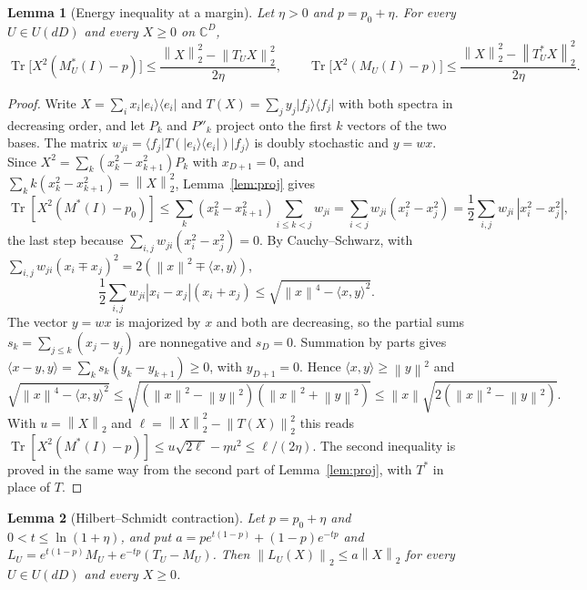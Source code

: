 \documentclass[11pt]{article}
\newtheorem{lemma}{Lemma}[section]
\theoremstyle{definition}
\theoremstyle{remark}
\DeclareMathOperator{\Tr}{Tr}
\newcommand{\C}{\mathbb C}
\newcommand{\norm}[1]{\left\lVert#1\right\rVert}
\newcommand{\ket}[1]{\lvert#1\rangle}
\newcommand{\bra}[1]{\langle#1\rvert}
\begin{document}
\begin{lemma}[Energy inequality at a margin]\label{lem:margin-energy}
Let $\eta>0$ and $p=p_0+\eta$. For every $U\in U(dD)$ and every $X\ge0$ on $\C^D$,
\[
 \Tr\bigl[X^2(M_U^*(I)-p)\bigr]\le\frac{\norm X_2^2-\norm{T_UX}_2^2}{2\eta},\qquad
 \Tr\bigl[X^2(M_U(I)-p)\bigr]\le\frac{\norm X_2^2-\norm{T_U^*X}_2^2}{2\eta}.
\]
\end{lemma}

\begin{proof}
Write $X=\sum_ix_i\ket{e_i}\bra{e_i}$ and $T(X)=\sum_jy_j\ket{f_j}\bra{f_j}$ with both spectra in decreasing order, and let $P_k$ and $P''_k$ project onto the first $k$ vectors of the two bases. The matrix $w_{ji}=\bra{f_j}T(\ket{e_i}\bra{e_i})\ket{f_j}$ is doubly stochastic and $y=wx$. Since $X^2=\sum_k(x_k^2-x_{k+1}^2)P_k$ with $x_{D+1}=0$, and $\sum_kk(x_k^2-x_{k+1}^2)=\norm X_2^2$, Lemma~\ref{lem:proj} gives
\[
 \Tr[X^2(M^*(I)-p_0)]\le\sum_k(x_k^2-x_{k+1}^2)\sum_{i\le k<j}w_{ji}=\sum_{i<j}w_{ji}(x_i^2-x_j^2)=\frac12\sum_{i,j}w_{ji}\,|x_i^2-x_j^2|,
\]
the last step because $\sum_{i,j}w_{ji}(x_i^2-x_j^2)=0$. By Cauchy--Schwarz, with $\sum_{i,j}w_{ji}(x_i\mp x_j)^2=2(\norm x^2\mp\langle x,y\rangle)$,
\[
 \frac12\sum_{i,j}w_{ji}|x_i-x_j|(x_i+x_j)\le\sqrt{\norm x^4-\langle x,y\rangle^2}.
\]
The vector $y=wx$ is majorized by $x$ and both are decreasing, so the partial sums $s_k=\sum_{j\le k}(x_j-y_j)$ are nonnegative and $s_D=0$. Summation by parts gives $\langle x-y,y\rangle=\sum_ks_k(y_k-y_{k+1})\ge0$, with $y_{D+1}=0$. Hence $\langle x,y\rangle\ge\norm y^2$ and
\[
 \sqrt{\norm x^4-\langle x,y\rangle^2}\le\sqrt{(\norm x^2-\norm y^2)(\norm x^2+\norm y^2)}\le\norm x\sqrt{2(\norm x^2-\norm y^2)}.
\]
With $u=\norm X_2$ and $\ell=\norm X_2^2-\norm{T(X)}_2^2$ this reads $\Tr[X^2(M^*(I)-p)]\le u\sqrt{2\ell}-\eta u^2\le\ell/(2\eta)$. The second inequality is proved in the same way from the second part of Lemma~\ref{lem:proj}, with $T^*$ in place of $T$.
\end{proof}

\begin{lemma}[Hilbert--Schmidt contraction]\label{lem:hs}
Let $p=p_0+\eta$ and $0<t\le\ln(1+\eta)$, and put $a=pe^{t(1-p)}+(1-p)e^{-tp}$ and $L_U=e^{t(1-p)}M_U+e^{-tp}(T_U-M_U)$. Then $\norm{L_U(X)}_2\le a\norm X_2$ for every $U\in U(dD)$ and every $X\ge0$.
\end{lemma}
\end{document}
